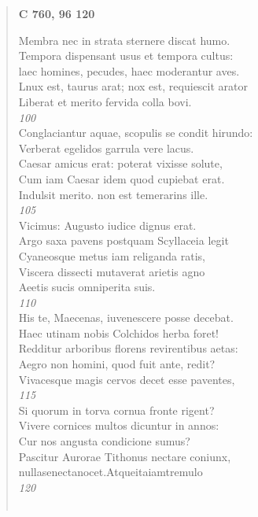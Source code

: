 \documentclass[11pt, a4paper]{report}
\begin{document}
\begin{verse}
    \begin{center} \textbf{C 760, 96 120} \end{center} \marginpar{[240]} Membra nec in strata sternere discat humo. \\ Tempora dispensant usus et tempora cultus: \\ laec homines, pecudes, haec moderantur aves. \\ Lnux est, taurus arat; nox est, requiescit arator \\ Liberat et merito fervida colla bovi. \\ \textit{100} \\ Conglaciantur aquae, scopulis se condit hirundo: \\ Verberat egelidos garrula vere lacus. \\ Caesar amicus erat: poterat vixisse solute, \\ Cum iam Caesar idem quod cupiebat erat. \\ Indulsit merito. non est temerarins ille. \\ \textit{105} \\ Vicimus: Augusto iudice dignus erat. \\ Argo saxa pavens postquam Scyllaceia legit \\ Cyaneosque metus iam religanda ratis, \\ Viscera dissecti mutaverat arietis agno \\ Aeetis sucis omniperita suis. \\ \textit{110} \\ His te, Maecenas, iuvenescere posse decebat. \\ Haec utinam nobis Colchidos herba foret! \\ Redditur arboribus florens revirentibus aetas: \\ Aegro non homini, quod fuit ante, redit? \\ Vivacesque magis cervos decet esse paventes, \\ \textit{115} \\ Si quorum in torva cornua fronte rigent? \\ Vivere cornices multos dicuntur in annos: \\ Cur nos angusta condicione sumus? \\ Pascitur Aurorae Tithonus nectare coniunx, \\ nullasenectanocet.Atqueitaiamtremulo \\ \textit{120} \\ 
        ﻿\pagebreak 

\end{verse}
\end{document}
